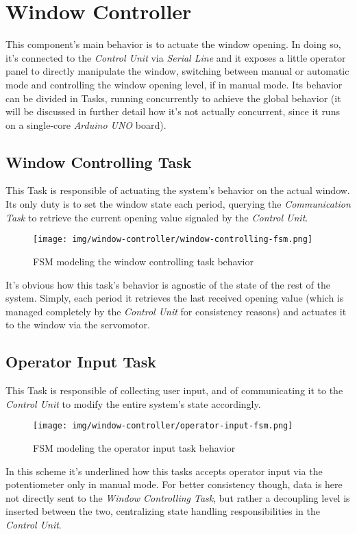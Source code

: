\documentclass[a4paper,12pt]{report}
\begin{document}
	\section{Window Controller} %
	This component's main behavior is to actuate the window opening. In doing so, it's connected to the \textit{Control Unit} via \textit{Serial Line} and it exposes a little operator panel to directly manipulate the window, switching between manual or automatic mode and controlling the window opening level, if in manual mode. Its behavior can be divided in Tasks, running concurrently to achieve the global behavior (it will be discussed in further detail how it's not actually concurrent, since it runs on a single-core \textit{Arduino UNO} board).
		\subsection{Window Controlling Task}
		This Task is responsible of actuating the system's behavior on the actual window. Its only duty is to set the window state each period, querying the \textit{Communication Task} to retrieve the current opening value signaled by the \textit{Control Unit}.
		\begin{figure}[H]
			\centering{}
			\texttt{[image: img/window-controller/window-controlling-fsm.png]}
			\caption{FSM modeling the window controlling task behavior}
			\label{img:window-controller/window-controlling-fsm}
		\end{figure}
		It's obvious how this task's behavior is agnostic of the state of the rest of the system. Simply, each period it retrieves the last received opening value (which is managed completely by the \textit{Control Unit} for consistency reasons) and actuates it to the window via the servomotor.
		\subsection{Operator Input Task}
		This Task is responsible of collecting user input, and of communicating it to the \textit{Control Unit} to modify the entire system's state accordingly.
		\begin{figure}[H]
			\centering{}
			\texttt{[image: img/window-controller/operator-input-fsm.png]}
			\caption{FSM modeling the operator input task behavior}
			\label{img:window-controller/operator-input-fsm}
		\end{figure}
		In this scheme it's underlined how this tasks accepts operator input via the potentiometer only in manual mode. For better consistency though, data is here not directly sent to the \textit{Window Controlling Task}, but rather a decoupling level is inserted between the two, centralizing state handling responsibilities in the \textit{Control Unit}.
\end{document}
